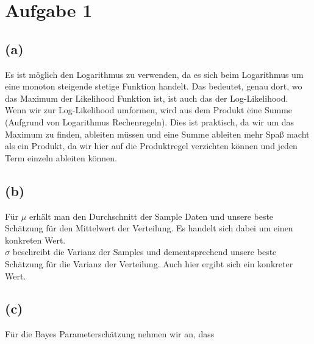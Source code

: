 \documentclass[a4paper]{scrartcl}
\begin{document}
\section*{Aufgabe 1}
\subsection*{(a)}
Es ist möglich den Logarithmus zu verwenden, da es sich beim Logarithmus um eine monoton steigende stetige Funktion handelt. Das bedeutet, genau dort, wo das Maximum der Likelihood Funktion ist, ist auch das der Log-Likelihood.\\
Wenn wir zur Log-Likelihood umformen, wird aus dem Produkt eine Summe (Aufgrund von Logarithmus Rechenregeln). Dies ist praktisch, da wir um das Maximum zu finden, ableiten müssen und eine Summe ableiten mehr Spaß macht als ein Produkt, da wir hier auf die Produktregel verzichten können und jeden Term einzeln ableiten können.


\subsection*{(b)}
Für $\mu$ erhält man den Durchschnitt der Sample Daten und unsere beste Schätzung für den Mittelwert der Verteilung. Es handelt sich dabei um einen konkreten Wert.\\
$\sigma$ beschreibt die Varianz der Samples und dementsprechend unsere beste Schätzung für die Varianz der Verteilung. Auch hier ergibt sich ein konkreter Wert.



\subsection*{(c)}
Für die Bayes Parameterschätzung nehmen wir an, dass 
\end{document}

